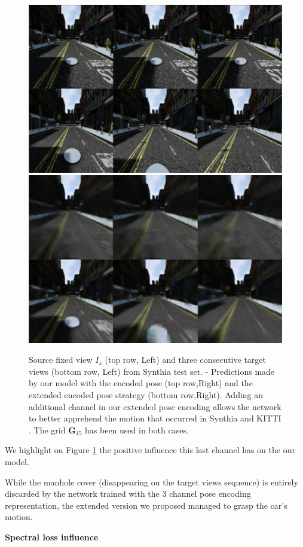 \begin{figure}[htp]

\begin{center}
\includegraphics[width=.45\textwidth]{images/epipolarnvs/ablationSynthia.png} \hfill
\includegraphics[width=.45\textwidth]{images/epipolarnvs/ablationSynthia2.png}
\end{center}
\caption{Source fixed view $I_s$ (top row, Left) and three consecutive target views (bottom row, Left) from Synthia \cite{ros2016synthia} test set. - Predictions made by our model with the encoded pose (top row,Right) and the extended encoded pose strategy (bottom row,Right). Adding an additional channel in our extended pose encoding allows the network to better apprehend the motion that occurred in Synthia \cite{ros2016synthia} and KITTI \cite{geiger2012we}. The grid $\textbf{G}_{15}$ has been used in both cases.}
\label{fig:ablaSynthia}
\end{figure}
We highlight on Figure \ref{fig:ablaSynthia} the positive influence this last channel has on the our model. 

While the manhole cover (disappearing on the target views sequence) is entirely discarded by the network trained with the 3 channel pose encoding representation, the extended version we proposed managed to grasp the car's motion.\newline 

\textbf{Spectral loss influence}

